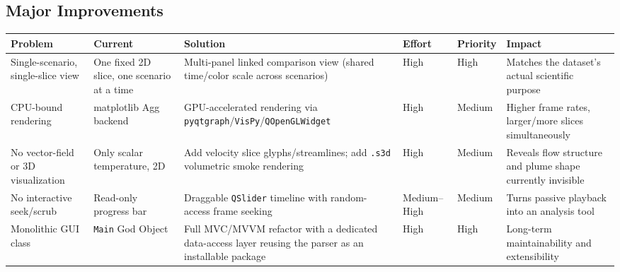 \documentclass[11pt,a4paper]{report}
\begin{document}
\begin{landscape}
\section{Major Improvements}
\begin{longtable}{p{2.6cm}p{3.4cm}p{3.4cm}p{1.4cm}p{1.2cm}p{2.6cm}}
\toprule
\textbf{Problem} & \textbf{Current} & \textbf{Solution} & \textbf{Effort} & \textbf{Priority} & \textbf{Impact} \\
\midrule
Single-scenario, single-slice view & One fixed 2D slice, one scenario at a time & Multi-panel linked comparison view (shared time/color scale across scenarios) & High & High & Matches the dataset's actual scientific purpose \\
CPU-bound rendering & matplotlib Agg backend & GPU-accelerated rendering via \texttt{pyqtgraph}/\texttt{VisPy}/\texttt{QOpenGLWidget} & High & Medium & Higher frame rates, larger/more slices simultaneously \\
No vector-field or 3D visualization & Only scalar temperature, 2D & Add velocity slice glyphs/streamlines; add \texttt{.s3d} volumetric smoke rendering & High & Medium & Reveals flow structure and plume shape currently invisible \\
No interactive seek/scrub & Read-only progress bar & Draggable \texttt{QSlider} timeline with random-access frame seeking & Medium--High & Medium & Turns passive playback into an analysis tool \\
Monolithic GUI class & \texttt{Main} God Object & Full MVC/MVVM refactor with a dedicated data-access layer reusing the parser as an installable package & High & High & Long-term maintainability and extensibility \\
\bottomrule
\end{longtable}


\end{landscape}
\end{document}
